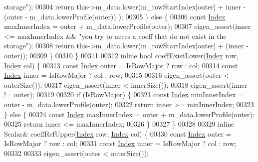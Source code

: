\begin{DoxyCode}
{       storage"});
00304             \textcolor{keywordflow}{return} this->m\_data.lower(m\_rowStartIndex[outer] + inner - (outer - m\_data.lowerProfile(outer))
      );
00305         \} \textcolor{keywordflow}{else} \{
00306             \textcolor{keyword}{const} \hyperlink{group___core___module_a554f30542cc2316add4b1ea0a492ff02}{Index} maxInnerIndex = outer + m\_data.lowerProfile(outer);
00307             eigen\_assert(inner <= maxInnerIndex && \textcolor{stringliteral}{"you try to acces a coeff that do not exist in the
       storage"});
00308             \textcolor{keywordflow}{return} this->m\_data.lower(m\_rowStartIndex[outer] + (inner - outer));
00309         \}
00310     \}
00311 
00312     \textcolor{keyword}{inline} \textcolor{keywordtype}{bool} coeffExistLower(\hyperlink{group___core___module_a554f30542cc2316add4b1ea0a492ff02}{Index} row, \hyperlink{group___core___module_a554f30542cc2316add4b1ea0a492ff02}{Index} col) \{
00313         \textcolor{keyword}{const} \hyperlink{group___core___module_a554f30542cc2316add4b1ea0a492ff02}{Index} outer = IsRowMajor ? row : col;
00314         \textcolor{keyword}{const} \hyperlink{group___core___module_a554f30542cc2316add4b1ea0a492ff02}{Index} inner = IsRowMajor ? col : row;
00315 
00316         eigen\_assert(outer < outerSize());
00317         eigen\_assert(inner < innerSize());
00318         eigen\_assert(inner != outer);
00319 
00320         \textcolor{keywordflow}{if} (IsRowMajor) \{
00321             \textcolor{keyword}{const} \hyperlink{group___core___module_a554f30542cc2316add4b1ea0a492ff02}{Index} minInnerIndex = outer - m\_data.lowerProfile(outer);
00322             \textcolor{keywordflow}{return} inner >= minInnerIndex;
00323         \} \textcolor{keywordflow}{else} \{
00324             \textcolor{keyword}{const} \hyperlink{group___core___module_a554f30542cc2316add4b1ea0a492ff02}{Index} maxInnerIndex = outer + m\_data.lowerProfile(outer);
00325             \textcolor{keywordflow}{return} inner <= maxInnerIndex;
00326         \}
00327     \}
00328 
00329     \textcolor{keyword}{inline} Scalar& coeffRefUpper(\hyperlink{group___core___module_a554f30542cc2316add4b1ea0a492ff02}{Index} row, \hyperlink{group___core___module_a554f30542cc2316add4b1ea0a492ff02}{Index} col) \{
00330         \textcolor{keyword}{const} \hyperlink{group___core___module_a554f30542cc2316add4b1ea0a492ff02}{Index} outer = IsRowMajor ? row : col;
00331         \textcolor{keyword}{const} \hyperlink{group___core___module_a554f30542cc2316add4b1ea0a492ff02}{Index} inner = IsRowMajor ? col : row;
00332 
00333         eigen\_assert(outer < outerSize());

\end{DoxyCode}
